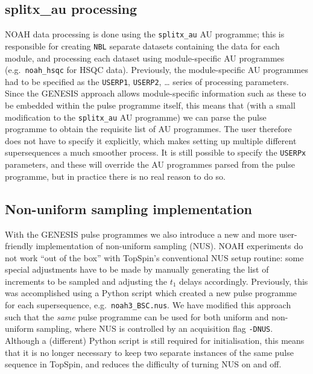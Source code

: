 \documentclass[a4paper,11pt]{article}
\newcommand{\carbon}{\ce{^{13}C}}
\begin{document}
\subsection{splitx\_au processing}
\label{subsec:splitx_au}

NOAH data processing is done using the \texttt{splitx\_au} AU programme; this is responsible for creating \texttt{NBL} separate datasets containing the data for each module, and processing each dataset using module-specific AU programmes (e.g.\ \texttt{noah\_hsqc} for \carbon{} HSQC data).
Previously, the module-specific AU programmes had to be specified as the \texttt{USERP1}, \texttt{USERP2}, \ldots{} series of processing parameters.
Since the GENESIS approach allows module-specific information such as these to be embedded within the pulse programme itself, this means that (with a small modification to the \texttt{splitx\_au} AU programme) we can parse the pulse programme to obtain the requisite list of AU programmes.
The user therefore does not have to specify it explicitly, which makes setting up multiple different supersequences a much smoother process.
It is still possible to specify the \texttt{USERPx} parameters, and these will override the AU programmes parsed from the pulse programme, but in practice there is no real reason to do so.

\subsection{Non-uniform sampling implementation}

With the GENESIS pulse programmes we also introduce a new and more user-friendly implementation of non-uniform sampling (NUS).
NOAH experiments do not work ``out of the box'' with TopSpin's conventional NUS setup routine: some special adjustments have to be made by manually generating the list of increments to be sampled and adjusting the $t_1$ delays accordingly.
Previously, this was accomplished using a Python script which created a new pulse programme for each supersequence, e.g.\ \texttt{noah3\_BSC.nus}.\autocite{Claridge2019MRC}
We have modified this approach such that the \textit{same} pulse programme can be used for both uniform and non-uniform sampling, where NUS is controlled by an acquisition flag \texttt{-DNUS}.
Although a (different) Python script is still required for initialisation, this means that it is no longer necessary to keep two separate instances of the same pulse sequence in TopSpin, and reduces the difficulty of turning NUS on and off.
\end{document}
